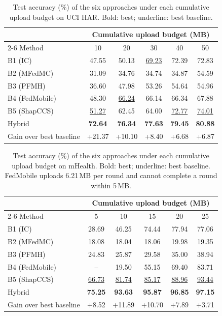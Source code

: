 \documentclass[sigconf]{acmart}
\newcommand{\method}{Hybrid}   %
\begin{document}
\begin{table}[t]
  \caption{Test accuracy (\%) of the six approaches under each cumulative upload budget on UCI HAR. Bold: best; underline: best baseline.}
  \label{tab:uci_summary}
  \centering
  \footnotesize
  \setlength{\tabcolsep}{5pt}
  \begin{tabular}{@{}l ccccc@{}}
  \toprule
   & \multicolumn{5}{c}{Cumulative upload budget (MB)} \\
  \cmidrule(l){2-6}
  Method & 10 & 20 & 30 & 40 & 50 \\
  \midrule
  B1 (IC)        & 47.55 & 50.13 & \underline{69.23} & 72.39 & 72.83 \\
  B2 (MFedMC)    & 31.09 & 34.76 & 34.74 & 34.87 & 54.59 \\
  B3 (PFMH)      & 36.60 & 47.98 & 53.26 & 54.64 & 54.96 \\
  B4 (FedMobile) & 48.30 & \underline{66.24} & 66.14 & 66.34 & 67.88 \\
  B5 (ShapCCS)   & \underline{51.27} & 62.45 & 64.00 & \underline{72.77} & \underline{74.01} \\
  \method{}      & \textbf{72.64} & \textbf{76.34} & \textbf{77.63} & \textbf{79.45} & \textbf{80.88} \\
  \midrule
  Gain over best baseline & +21.37 & +10.10 & +8.40 & +6.68 & +6.87 \\
  \bottomrule
  \end{tabular}
  \end{table}

  \begin{table}[t]
    \caption{Test accuracy (\%) of the six approaches under each cumulative upload budget on mHealth. Bold: best; underline: best baseline. FedMobile uploads 6.21\,MB per round and cannot complete a round within 5\,MB.}
    \label{tab:mhealth_summary}
    \centering
    \footnotesize
    \setlength{\tabcolsep}{5pt}
    \begin{tabular}{@{}l ccccc@{}}
    \toprule
     & \multicolumn{5}{c}{Cumulative upload budget (MB)} \\
    \cmidrule(l){2-6}
    Method & 5 & 10 & 15 & 20 & 25 \\
    \midrule
    B1 (IC)        & 28.69 & 46.25 & 74.44 & 77.94 & 77.06 \\
    B2 (MFedMC)    & 18.08 & 18.04 & 18.06 & 19.98 & 19.35 \\
    B3 (PFMH)      & 24.83 & 25.87 & 29.58 & 35.00 & 38.94 \\
    B4 (FedMobile) & -- & 19.50 & 55.15 & 69.40 & 83.71 \\
    B5 (ShapCCS)   & \underline{66.73} & \underline{81.74} & \underline{85.17} & \underline{88.96} & \underline{93.44} \\
    \method{}      & \textbf{75.25} & \textbf{93.63} & \textbf{95.87} & \textbf{96.85} & \textbf{97.15} \\
    \midrule
    Gain over best baseline & +8.52 & +11.89 & +10.70 & +7.89 & +3.71 \\
    \bottomrule
    \end{tabular}
    \end{table}
\end{document}

